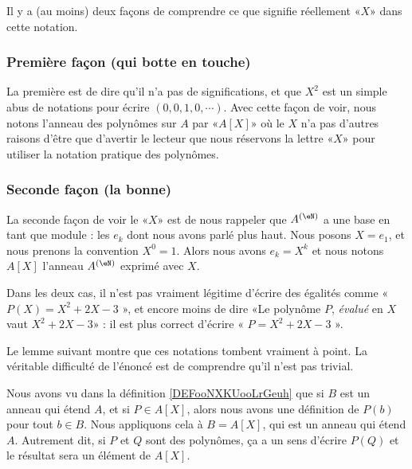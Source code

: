 Il y a (au moins) deux façons de comprendre ce que signifie réellement «\( X\)» dans cette notation.

\subsubsection{Première façon (qui botte en touche)}

La première est de dire qu'il n'a pas de significations, et que \( X^2\) est un simple abus de notations pour écrire \( (0,0,1,0,\cdots)\). Avec cette façon de voir, nous notons l'anneau des polynômes sur \( A\) par «\( A[X]\)» où le \( X\) n'a pas d'autres raisons d'être que d'avertir le lecteur que nous réservons la lettre «\( X\)» pour utiliser la notation pratique des polynômes.

\subsubsection{Seconde façon (la bonne)}
\label{SUBSUBSECooPNBYooWXEHrg}

\begin{normaltext}      \label{NORMooHHIVooSfHlxv}
    La seconde façon de voir le «\( X\)» est de nous rappeler que \( A^{(\eN)}\) a une base en tant que module : les \( e_k\) dont nous avons parlé plus haut. Nous posons \( X=e_1\), et nous prenons la convention \( X^0=1\). Alors nous avons \( e_k=X^k\) et nous notons \( A[X]\) l'anneau \(A^{(\eN)}\) exprimé avec \( X\).

    Dans les deux cas, il n'est pas vraiment légitime d'écrire des égalités comme « \( P(X)=X^2+2X-3\) », et encore moins de dire «Le polynôme \( P\), \emph{évalué} en \( X\) vaut \( X^2+2X-3\)»  : il est plus correct d'écrire « \( P=X^2+2X-3\) ».

    Le lemme suivant montre que ces notations tombent vraiment à point. La véritable difficulté de l'énoncé est de comprendre qu'il n'est pas trivial.

    Nous avons vu dans la définition \ref{DEFooNXKUooLrGeuh} que si \( B\) est un anneau qui étend \( A\), et si \(P\in A[X] \), alors nous avons une définition de \( P(b)\) pour tout \( b\in B\). Nous appliquons cela à \( B=A[X]\), qui est un anneau qui étend \( A\). Autrement dit, si \( P\) et \( Q\) sont des polynômes, ça a un sens d'écrire \( P(Q)\) et le résultat sera un élément de \( A[X]\). 
\end{normaltext}

